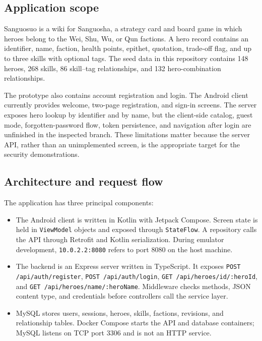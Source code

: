 \subsection{Application scope}

Sanguosuo is a wiki for Sanguosha, a strategy card and board game in which heroes belong to the Wei, Shu, Wu, or Qun factions. A hero record contains an identifier, name, faction, health points, epithet, quotation, trade-off flag, and up to three skills with optional tags. The seed data in this repository contains 148 heroes, 268 skills, 86 skill--tag relationships, and 132 hero-combination relationships.

The prototype also contains account registration and login. The Android client currently provides welcome, two-page registration, and sign-in screens. The server exposes hero lookup by identifier and by name, but the client-side catalog, guest mode, forgotten-password flow, token persistence, and navigation after login are unfinished in the inspected branch. These limitations matter because the server API, rather than an unimplemented screen, is the appropriate target for the security demonstrations.

\subsection{Architecture and request flow}

The application has three principal components:

\begin{itemize}
	\item The Android client is written in Kotlin with Jetpack Compose. Screen state is held in \verb|ViewModel| objects and exposed through \verb|StateFlow|. A repository calls the API through Retrofit and Kotlin serialization. During emulator development, \verb|10.0.2.2:8080| refers to port 8080 on the host machine.
	\item The backend is an Express server written in TypeScript. It exposes \verb|POST /api/auth/register|, \verb|POST /api/auth/login|, \verb|GET /api/heroes/id/:heroId|, and \verb|GET /api/heroes/name/:heroName|. Middleware checks methods, JSON content type, and credentials before controllers call the service layer.
	\item MySQL stores users, sessions, heroes, skills, factions, revisions, and relationship tables. Docker Compose starts the API and database containers; MySQL listens on TCP port 3306 and is not an HTTP service.
\end{itemize}

